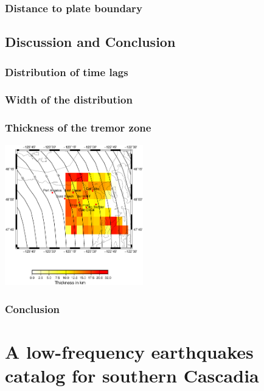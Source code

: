 \documentclass{beamer}
\begin{document}
	\begin{frame}
		\frametitle{Distance to plate boundary}
	\end{frame}

	\subsection{Discussion and Conclusion}

	\begin{frame}
		\frametitle{Distribution of time lags}
	\end{frame}

	\begin{frame}
		\frametitle{Width of the distribution}
	\end{frame}

	\begin{frame}
		\frametitle{Thickness of the tremor zone}
		\begin{center}
			\includegraphics[width=6cm, trim={1cm 3cm 2cm 6cm}, clip]{other/thickness_PWS_PWS.eps}
		\end{center}
	\end{frame}

	\begin{frame}
		\frametitle{Conclusion}
	\end{frame}


	\section{A low-frequency earthquakes catalog for southern Cascadia}
\end{document}
